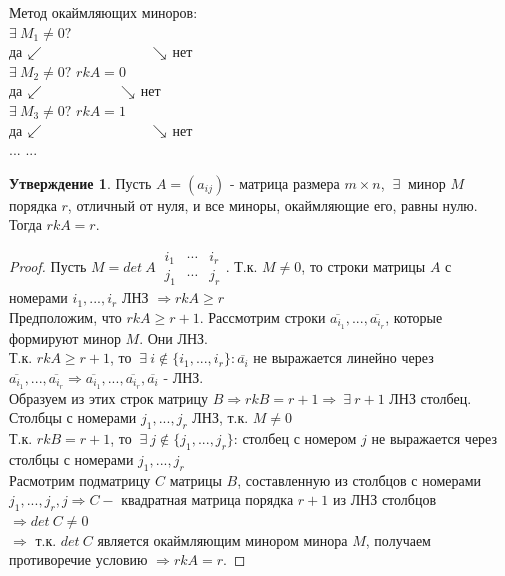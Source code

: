\documentclass[a4paper, 12pt]{article}
\newcommand\tab[1][.5cm]{\hspace*{#1}}
\theoremstyle{definition}
\newtheorem*{subtheorem}{Утверждение}
\begin{document}
  Метод окаймляющих миноров: \vspace{0.2cm}\\
  \tab[7cm]$\exists \ M_1 \not = 0 ?$ \vspace{0.15cm}\\
  \tab[5.5cm] да $\swarrow \tab[2.8cm] \searrow $ нет \vspace{0.15cm}\\
  \tab[4.6cm]$\exists \ M_2 \not = 0 ?$ \tab[2.6cm] $rkA =0$ \vspace{0.15cm}\\ 
  \tab[3.3cm] да $\swarrow \tab[2cm] \searrow $ нет \vspace{0.15cm} \\
  \tab[2.3cm]$\exists \ M_3 \not = 0 ?$ \tab[2cm] $rkA = 1$ \vspace{0.15cm}\\
  \tab[1cm] да $\swarrow \tab[2.8cm] \searrow $ нет \vspace{0.15cm}\\
  \tab[1.3cm]$...$ \tab[4cm] $...$
  \begin{subtheorem}
    Пусть $A = (a_{ij})$ - матрица размера $m \times n$, $\ \exists \ $ минор $M$ порядка $r$, отличный от нуля, и все миноры, окаймляющие его, равны нулю. \\
    Тогда $rkA = r$.
  \end{subtheorem} 
  \begin{proof}
    Пусть $M = det \ A \ \begin{matrix}
      i_1 & \cdots & i_r \\
      j_1 & \cdots & j_r
    \end{matrix}$. \vspace{0.3cm} Т.к. $M \not = 0$, то строки матрицы $A$ с номерами $i_1,...,i_r$ ЛНЗ $\Longrightarrow rkA \geq r$ \\
    Предположим, что $rkA \geq r+1$. Рассмотрим строки $\overline{a_{i_1}},...,\overline{a_{i_r}}$, которые формируют минор $M$. Они ЛНЗ. \\
    Т.к. $rkA \geq r+1$, то $\ \exists \ i \not \in \{i_1,...,i_r\}: \overline{a_i}$ не выражается линейно через \\ $\overline{a_{i_1}},...,\overline{a_{i_r}} \Longrightarrow \overline{a_{i_1}},...,\overline{a_{i_r}}, \overline{a_i}$ - ЛНЗ. \\
    Образуем из этих строк матрицу $B \Longrightarrow rkB = r+1 \Longrightarrow \ \exists \ r+1$ ЛНЗ столбец. \\
    Столбцы с номерами $j_1,...,j_r$ ЛНЗ, т.к. $M \not = 0$ \\
    Т.к. $rkB = r+1$, то $\ \exists \ j \not \in \{j_1,...,j_r\}$: столбец с номером $j$ не выражается через столбцы с номерами $j_1,...,j_r$ \\
    Расмотрим подматрицу $C$ матрицы $B$, составленную из столбцов с номерами $j_1,...,j_r,j \Longrightarrow C-$ квадратная матрица порядка $r+1$ из ЛНЗ столбцов $\Longrightarrow det \ C \not = 0$\\
    $\Longrightarrow $ т.к. $det \ C $ является окаймляющим минором минора $M$, получаем противоречие условию $\Longrightarrow rkA = r$.    
  \end{proof} 
\end{document}
